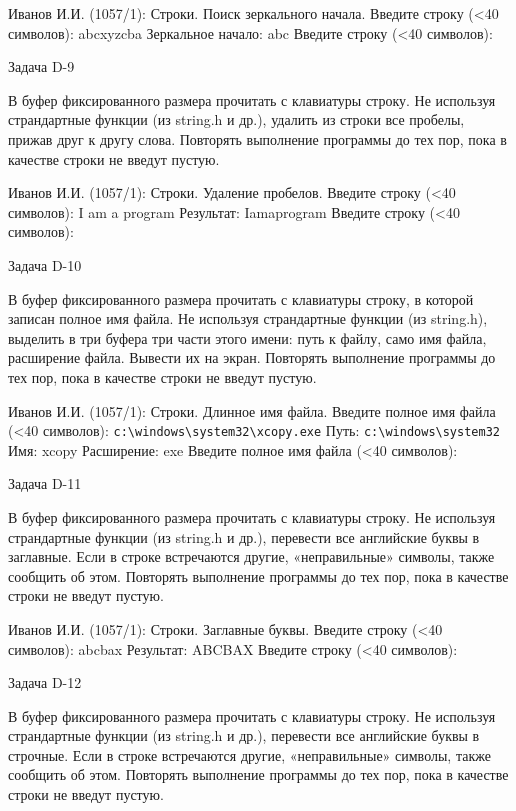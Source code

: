 Иванов И.И. (1057/1): Строки. Поиск зеркального начала.
Введите строку (<40 символов): abcxyzcba
Зеркальное начало: abc
Введите строку (<40 символов):


Задача D-9

В буфер фиксированного размера прочитать с клавиатуры строку. Не используя
страндартные функции (из string.h и др.), удалить из строки все пробелы,
прижав друг к другу слова. Повторять выполнение программы до тех пор, пока в
качестве строки не введут пустую.

Иванов И.И. (1057/1): Строки. Удаление пробелов.
Введите строку (<40 символов): I am a program
Результат: Iamaprogram
Введите строку (<40 символов):


Задача D-10

В буфер фиксированного размера прочитать с клавиатуры строку, в которой
записан полное имя файла. Не используя страндартные функции (из string.h),
выделить в три буфера три части этого имени: путь к файлу, само имя файла,
расширение файла. Вывести их на экран. Повторять выполнение программы до тех
пор, пока в качестве строки не введут пустую.

Иванов И.И. (1057/1): Строки. Длинное имя файла.
Введите полное имя файла (<40 символов): \verb|c:\windows\system32\xcopy.exe|
Путь: \verb|с:\windows\system32|
Имя: xcopy
Расширение: exe
Введите полное имя файла (<40 символов):


Задача D-11

В буфер фиксированного размера прочитать с клавиатуры строку. Не используя
страндартные функции (из string.h и др.), перевести все английские буквы в
заглавные. Если в строке встречаются другие, «неправильные» символы, также
сообщить об этом. Повторять выполнение программы до тех пор, пока в качестве
строки не введут пустую.

Иванов И.И. (1057/1): Строки. Заглавные буквы.
Введите строку (<40 символов): abcbax
Результат: ABCBAX
Введите строку (<40 символов):


Задача D-12

В буфер фиксированного размера прочитать с клавиатуры строку. Не используя
страндартные функции (из string.h и др.), перевести все английские буквы в
строчные. Если в строке встречаются другие, «неправильные» символы, также
сообщить об этом. Повторять выполнение программы до тех пор, пока в качестве
строки не введут пустую.

